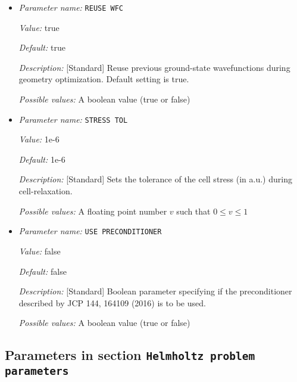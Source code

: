 \begin{itemize}
{\it Possible values:} An integer $n$ such that $0\leq n \leq 2$
\item {\it Parameter name:} {\tt REUSE WFC}
\label{parameters:Geometry/Optimization/REUSE WFC}
\label{parameters:Geometry/Optimization/REUSE_20WFC}


{\it Value:} true


{\it Default:} true


{\it Description:} [Standard] Reuse previous ground-state wavefunctions during geometry optimization. Default setting is true.


{\it Possible values:} A boolean value (true or false)
\item {\it Parameter name:} {\tt STRESS TOL}
\label{parameters:Geometry/Optimization/STRESS TOL}
\label{parameters:Geometry/Optimization/STRESS_20TOL}


{\it Value:} 1e-6


{\it Default:} 1e-6


{\it Description:} [Standard] Sets the tolerance of the cell stress (in a.u.) during cell-relaxation.


{\it Possible values:} A floating point number $v$ such that $0 \leq v \leq 1$
\item {\it Parameter name:} {\tt USE PRECONDITIONER}
\label{parameters:Geometry/Optimization/USE PRECONDITIONER}
\label{parameters:Geometry/Optimization/USE_20PRECONDITIONER}


{\it Value:} false


{\it Default:} false


{\it Description:} [Standard] Boolean parameter specifying if the preconditioner described by JCP 144, 164109 (2016) is to be used.


{\it Possible values:} A boolean value (true or false)
\end{itemize}

\subsection{Parameters in section \tt Helmholtz problem parameters}
\label{parameters:Helmholtz_20problem_20parameters}

